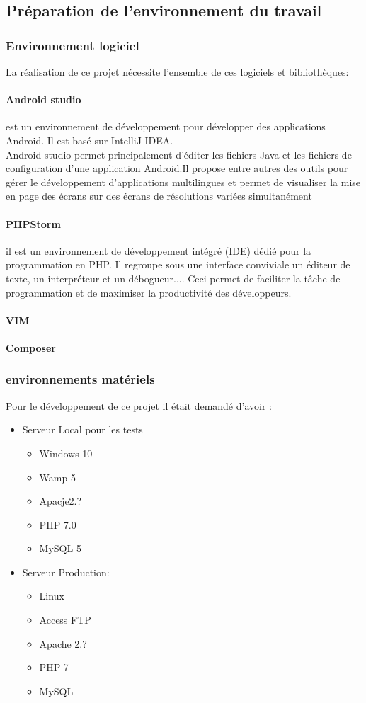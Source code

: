 \subsection{Préparation de l'environnement du travail}
\subsubsection{Environnement logiciel}
La réalisation de ce projet nécessite l’ensemble de ces logiciels et bibliothèques:
\paragraph{Android studio}est un environnement
de développement pour développer des applications Android. Il est basé sur IntelliJ IDEA.\\
Android studio permet principalement d'éditer les fichiers Java et les fichiers 
de configuration d'une application 
Android.Il propose entre autres des outils pour gérer le développement d'applications multilingues 
et permet de visualiser la mise en page des écrans sur des écrans de résolutions variées simultanément
\paragraph{PHPStorm}
il est un environnement de développement intégré (IDE) dédié pour la
programmation en PHP. Il regroupe sous une interface conviviale un éditeur de texte, un
interpréteur et un débogueur.... Ceci permet de faciliter la tâche de programmation et de
maximiser la productivité des développeurs.
\paragraph{VIM}
\paragraph{Composer}
\subsubsection{environnements matériels}
Pour le développement de ce projet il était demandé d’avoir :
\begin{itemize}
 \item Serveur Local pour les tests
 \begin{itemize}
     \item Windows 10
     \item Wamp 5
     \item Apacje2.?
     \item PHP 7.0
     \item MySQL 5 
 \end{itemize}
 \item Serveur Production: 
 \begin{itemize}
  \item Linux
  \item Access FTP
  \item Apache 2.? 
  \item  PHP 7
  \item  MySQL
 \end{itemize}
\end{itemize}

